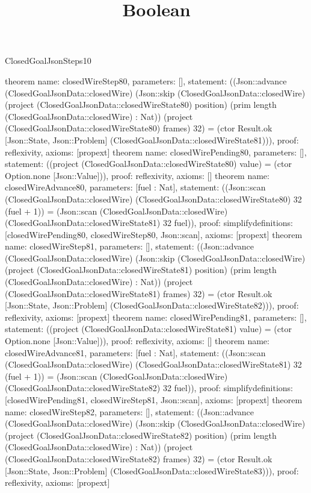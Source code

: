 \begin{lexlean}{ClosedGoalJsonSteps10}
\title{Boolean}
\begin{semanticmodule}
theorem{
 name: closedWireStep80, parameters: [],
 statement: ((Json::advance (ClosedGoalJsonData::closedWire) (Json::skip (ClosedGoalJsonData::closedWire) (project (ClosedGoalJsonData::closedWireState80) position) (prim length (ClosedGoalJsonData::closedWire) : Nat)) (project (ClosedGoalJsonData::closedWireState80) frames) 32) = (ctor Result.ok [Json::State, Json::Problem] (ClosedGoalJsonData::closedWireState81))), proof: reflexivity{}, axioms: [propext]
}
theorem{
 name: closedWirePending80, parameters: [],
 statement: ((project (ClosedGoalJsonData::closedWireState80) value) = (ctor Option.none [Json::Value])), proof: reflexivity{}, axioms: []
}
theorem{
 name: closedWireAdvance80, parameters: [fuel : Nat],
 statement: ((Json::scan (ClosedGoalJsonData::closedWire) (ClosedGoalJsonData::closedWireState80) 32 (fuel + 1)) = (Json::scan (ClosedGoalJsonData::closedWire) (ClosedGoalJsonData::closedWireState81) 32 fuel)), proof: simplify{definitions: [closedWirePending80, closedWireStep80, Json::scan]}, axioms: [propext]
}
theorem{
 name: closedWireStep81, parameters: [],
 statement: ((Json::advance (ClosedGoalJsonData::closedWire) (Json::skip (ClosedGoalJsonData::closedWire) (project (ClosedGoalJsonData::closedWireState81) position) (prim length (ClosedGoalJsonData::closedWire) : Nat)) (project (ClosedGoalJsonData::closedWireState81) frames) 32) = (ctor Result.ok [Json::State, Json::Problem] (ClosedGoalJsonData::closedWireState82))), proof: reflexivity{}, axioms: [propext]
}
theorem{
 name: closedWirePending81, parameters: [],
 statement: ((project (ClosedGoalJsonData::closedWireState81) value) = (ctor Option.none [Json::Value])), proof: reflexivity{}, axioms: []
}
theorem{
 name: closedWireAdvance81, parameters: [fuel : Nat],
 statement: ((Json::scan (ClosedGoalJsonData::closedWire) (ClosedGoalJsonData::closedWireState81) 32 (fuel + 1)) = (Json::scan (ClosedGoalJsonData::closedWire) (ClosedGoalJsonData::closedWireState82) 32 fuel)), proof: simplify{definitions: [closedWirePending81, closedWireStep81, Json::scan]}, axioms: [propext]
}
theorem{
 name: closedWireStep82, parameters: [],
 statement: ((Json::advance (ClosedGoalJsonData::closedWire) (Json::skip (ClosedGoalJsonData::closedWire) (project (ClosedGoalJsonData::closedWireState82) position) (prim length (ClosedGoalJsonData::closedWire) : Nat)) (project (ClosedGoalJsonData::closedWireState82) frames) 32) = (ctor Result.ok [Json::State, Json::Problem] (ClosedGoalJsonData::closedWireState83))), proof: reflexivity{}, axioms: [propext]
}
\end{semanticmodule}
\end{lexlean}
